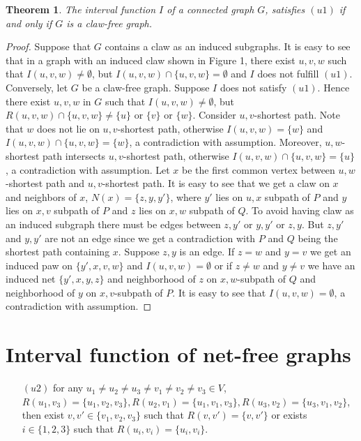\documentclass[10pt,a4paper]{article}
\newtheorem{theorem}{Theorem}
\begin{document}
\begin{theorem}
The interval function $I$ of a connected graph $G$, satisfies $(u1)$ if and only if $G$ is a claw-free graph.
\end{theorem}
\begin{proof}
Suppose that $G$ contains a claw as an induced subgraphs. It is easy to see that in a graph with an induced claw shown in Figure 1, there exist $u,v,w$ such that $I(u,v,w)\neq\emptyset$, but $I(u,v,w)\cap \{u,v,w\}=\emptyset$ and $I$ does not fulfill $(u1)$.\\

Conversely,  let $G$ be a claw-free graph. Suppose $I$ does not satisfy $(u1)$.  Hence there exist $u,v,w$ in $G$ such that $I(u,v,w)\neq\emptyset$, but $R(u,v,w)\cap \{u,v,w\}\neq\{u\}$ or $\{v\}$ or $\{w\}$.
Consider $u,v$-shortest path. Note that $w$ does not lie on $u,v$-shortest path, otherwise $I(u,v,w)=\{w\}$ and $I(u,v,w)\cap\{u,v,w\} =\{w\}$, a contradiction with assumption. Moreover, $u,w$-shortest path intersects $u,v$-shortest path, otherwise $I(u,v,w)\cap\{u,v,w\} =\{u\}$, a contradiction with assumption. Let $x$ be the first common vertex between $u,w$-shortest path and $u,v$-shortest path. It is easy to see that we get a claw on $x$ and neighbors of $x$,
$N(x)=\{z,y,y'\}$, where $y'$ lies on $u,x$ subpath of $P$ and $y$ lies on $x,v$ subpath of $P$ and $z$ lies on $x,w$ subpath of $Q$. To avoid having claw as an induced subgraph there must be edges between $z,y'$ or $y,y'$ or $z,y$. But $z,y'$ and $y,y'$ are not an edge since we get a contradiction with $P$ and $Q$ being the shortest path containing $x$. Suppose $z,y$ is an edge.
If $z=w$ and $y=v$  we get an induced paw on $\{y',x,v,w\}$ and $I(u,v,w)=\emptyset$ or if $z\neq w$ and $y\neq v$ we have an induced net $\{y',x,y,z\}$ and neighborhood of $z$ on $x,w$-subpath of $Q$ and neighborhood of $y$ on $x,v$-subpath of $P$. It is easy to see that $I(u,v,w)=\emptyset$, a contradiction with assumption.  
\end{proof}

\section{Interval function of net-free graphs }

\begin{itemize}
\item[$(u2)$] for any $u_1 \neq u_2\neq u_3 \neq v_1 \neq v_2 \neq v_3 \in V $, $R(u_1,v_3) = \{u_1,v_2,v_3\}, R(u_2,v_1) = \{u_1,v_1,v_3\}, R(u_3,v_2) = \{u_3,v_1,v_2\}$, then exist $v,v' \in \{v_1,v_2,v_3\}$ such that $R(v,v')=\{v,v'\}$ or exists $i \in \{1,2,3\}$ such that $R(u_i,v_i) =  \{u_i,v_i\}$.
\end{itemize}
\end{document}
